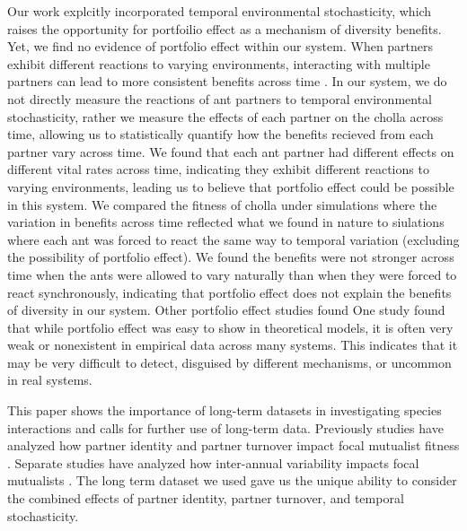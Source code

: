 \documentclass[11pt]{article}
\begin{document}
Our work explcitly incorporated temporal environmental stochasticity, which raises the opportunity for portfoilio effect as a mechanism of diversity benefits. Yet, we find no evidence of portfolio effect within our system. 
When partners exhibit different reactions to varying environments, interacting with multiple partners can lead to more consistent benefits across time \citep{Batstone2018}.
In our system, we do not directly measure the reactions of ant partners to temporal environmental stochasticity, rather we measure the effects of each partner on the cholla across time, allowing us to statistically quantify how the benefits recieved from each partner vary across time.
We found that each ant partner had different effects on different vital rates across time,  indicating they exhibit different reactions to varying environments, leading us to believe that portfolio effect could be possible in this system. 
We compared the fitness of cholla under simulations where the variation in benefits across time reflected what we found in nature to siulations where each ant was forced to react the same way to temporal variation (excluding the possibility of portfolio effect).
We found the benefits were not stronger across time when the ants were allowed to vary naturally than when they were forced to react synchronously, indicating that portfolio effect does not explain the benefits of diversity in our system.
Other portfolio effect studies \citep{Lazaro2022,Tornos2023} found 
One study \cite{Dallas2021} found that while portfolio effect was easy to show in theoretical models, it is often very weak or nonexistent in empirical data across many systems. 
This indicates that it may be very difficult to detect, disguised by different mechanisms, or uncommon in real systems.

This paper shows the importance of long-term datasets in investigating species interactions and calls for further use of long-term data. 
Previously studies have analyzed how partner identity and partner turnover impact focal mutualist fitness \cite{Fonseca2003, Dejean2008, Noe1994, Barrett2015, Bruna2014, Trojelsgaard2015}.
Separate studies have analyzed how inter-annual variability impacts focal mutualists \cite{Alonso1998, Alarcon2008, Ollerton2006, Horvitz1990, Lazaro2022}.
The long term dataset we used gave us the unique ability to consider the combined effects of partner identity, partner turnover, and temporal stochasticity.
\end{document}

